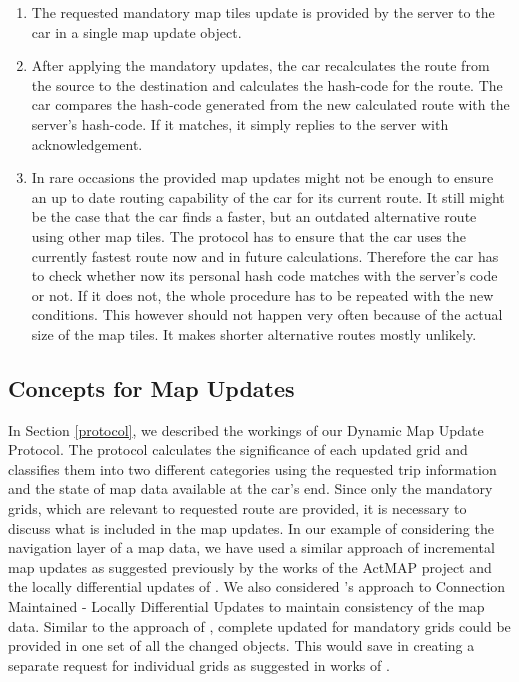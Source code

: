 \begin{enumerate}
\item The requested mandatory map tiles update is provided by the server to the car in a single map update object.

\item After applying the mandatory updates, the car recalculates the route from the source to the destination and calculates the hash-code for the route. The car compares the hash-code generated from the new calculated route with the server's hash-code. If it matches, it simply replies to the server with acknowledgement. 

\item In rare occasions the provided map updates might not be enough to ensure an up to date routing capability of the car for its current route. It still might be the case that the car finds a faster, but an outdated alternative route using other map tiles. The protocol has to ensure that the car uses the currently fastest route now and in future calculations. Therefore the car has to check whether now its personal hash code matches with the server's code or not. If it does not, the whole procedure has to be repeated with the new conditions. This however should not happen very often because of the actual size of the map tiles. It makes shorter alternative routes mostly unlikely.



\end{enumerate}


\subsection{Concepts for Map Updates} \label{calcmu}
In Section \ref{protocol}, we described the workings of our Dynamic Map Update Protocol. The protocol calculates the significance of each updated grid and classifies them into two different categories using the requested trip information and the state of map data available at the car's end. Since only the mandatory grids, which are relevant to requested route are provided, it is necessary to discuss what is included in the map updates. In our example of considering the navigation layer of a map data, we have used a similar approach of incremental map updates as suggested previously by the works of the ActMAP project \cite{flament2003actmap} and the locally differential updates of \citet{sakamoto2000proposal}. We also considered \citet{asahara2008locally}'s approach to Connection Maintained - Locally Differential Updates to maintain consistency of the map data. Similar to the approach of \citet{hitachi}, complete updated for mandatory grids could be provided in one set of all the changed objects. This would save in creating a separate request for individual grids as suggested in works of \citet{min2011system}.

